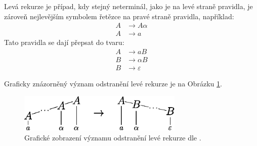 Levá rekurze je případ, kdy stejný neterminál, jako je na levé straně pravidla, je zároveň nejlevějším symbolem řetězce na pravé straně pravidla, například:
\begin{align*}
    A &\rightarrow A\alpha\\
    A &\rightarrow a
\end{align*}
Tato pravidla se dají přepsat do tvaru:
\begin{align*}
    A &\rightarrow aB\\
    B &\rightarrow \alpha B\\
    B &\rightarrow \varepsilon
\end{align*}

Graficky znázorněný význam odstranění levé rekurze je na Obrázku \ref{fig_leva_rekurze}.

\begin{figure}[ht]
    \centering
    \includegraphics[width=0.7\textwidth]{obrazky-figures/leva_rekurze.eps}
    \caption{Grafické zobrazení významu odstranění levé rekurze dle \cite{meduna2017sa-shora-dolu}.}
    \label{fig_leva_rekurze}
\end{figure}


